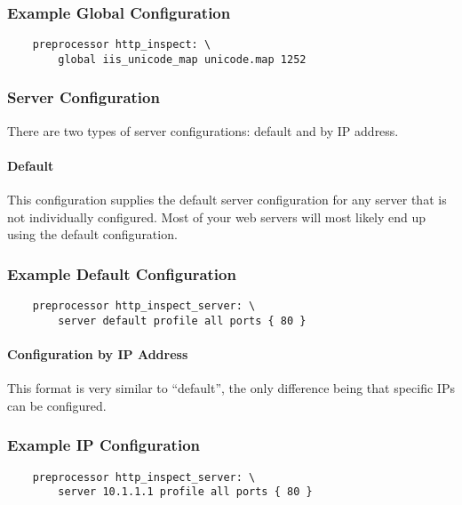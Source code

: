 \documentclass[english]{report}
\begin{document}
\subsubsection{Example Global Configuration}

\begin{verbatim}
    preprocessor http_inspect: \
        global iis_unicode_map unicode.map 1252
\end{verbatim}

\subsubsection{Server Configuration}

There are two types of server configurations: default and by IP address.

\paragraph{Default}

This configuration supplies the default server configuration for any server
that is not individually configured.  Most of your web servers will most likely
end up using the default configuration.

\subsubsection{Example Default Configuration}

\begin{verbatim}
    preprocessor http_inspect_server: \
        server default profile all ports { 80 }
\end{verbatim}

\paragraph{Configuration by IP Address}

This format is very similar to ``default'', the only difference being that
specific IPs can be configured.

\subsubsection{Example IP Configuration}

\begin{verbatim}
    preprocessor http_inspect_server: \
        server 10.1.1.1 profile all ports { 80 }
\end{verbatim}
\end{document}
